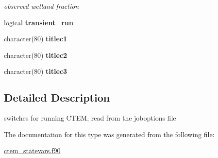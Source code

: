 \begin{DoxyCompactItemize}
\begin{DoxyCompactList}\small\item\em observed wetland fraction \end{DoxyCompactList}\item 
\hypertarget{structctem__statevars_1_1ctem__switches_a38ff512e235b3dd8a02c05d4d990ab99}{}logical {\bfseries transient\+\_\+run}\label{structctem__statevars_1_1ctem__switches_a38ff512e235b3dd8a02c05d4d990ab99}

\item 
\hypertarget{structctem__statevars_1_1ctem__switches_a4feb503a6f958c0f89f9162fcccc32c7}{}character(80) {\bfseries titlec1}\label{structctem__statevars_1_1ctem__switches_a4feb503a6f958c0f89f9162fcccc32c7}

\item 
\hypertarget{structctem__statevars_1_1ctem__switches_aed3b1557dad2e616fe2349b39e7e7abd}{}character(80) {\bfseries titlec2}\label{structctem__statevars_1_1ctem__switches_aed3b1557dad2e616fe2349b39e7e7abd}

\item 
\hypertarget{structctem__statevars_1_1ctem__switches_a6a2c0c4c8b178c50ee3529251121e6d0}{}character(80) {\bfseries titlec3}\label{structctem__statevars_1_1ctem__switches_a6a2c0c4c8b178c50ee3529251121e6d0}

\end{DoxyCompactItemize}


\subsection{Detailed Description}
switches for running C\+T\+E\+M, read from the joboptions file 

The documentation for this type was generated from the following file\+:\begin{DoxyCompactItemize}
\item 
\hyperlink{ctem__statevars_8f90}{ctem\+\_\+statevars.\+f90}\end{DoxyCompactItemize}
